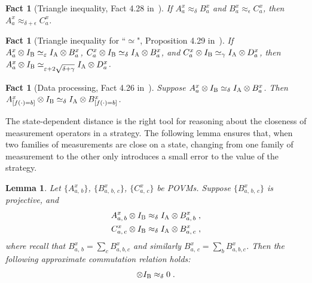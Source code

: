 \documentclass[11pt]{article}
\newtheorem{lemma}[theorem]{Lemma}
\newtheorem{fact}[theorem]{Fact}
\theoremstyle{definition}
\newcommand{\Id}{\ensuremath{I}}
\newcommand{\eps}{\varepsilon}
\newcommand{\labelstyle}[1]{\ensuremath{\textsc{#1}}\xspace}
\newcommand{\alice}{\labelstyle{A}}
\newcommand{\bob}{\labelstyle{B}}
\newcommand{\abc}[1][\delta]{\otimes I_\bob \simeq_{#1} I_\alice \otimes}
\begin{document}
\begin{fact}[Triangle inequality, Fact 4.28 in~\cite{NW19}]
  \label{fact:triangle}
  If $A_a^x \approx_\delta B_a^x$ and $B_a^x \approx_\epsilon C_a^x$, then
  $A_a^x \approx_{\delta + \epsilon} C_a^x$.
\end{fact}

\begin{fact}[Triangle inequality for ``$\simeq$", Proposition 4.29 in~\cite{ML20}]
 \label{fact:triangle-for-simeq}
 If $A_a^x \otimes I_\bob \simeq_\eps I_\alice \otimes B_a^x$,
 $C_a^x \otimes I_\bob \simeq_\delta I_\alice \otimes  B_a^x$,
 and $C_a^x \otimes I_\bob \simeq_\gamma I_\alice \otimes  D_a^x$,
 then $A_a^x \otimes I_\bob \simeq_{\eps + 2\sqrt{\delta + \gamma}} I_\alice \otimes  D_a^x$.
\end{fact}

\begin{fact}[Data processing, Fact 4.26 in~\cite{NW19}]
  \label{fact:data-processing}
  Suppose $A^x_a \abc B^x_a$.
  Then $A^x_{[f(\cdot) = b]} \abc B^x_{[f(\cdot) = b]}$.
\end{fact}


The state-dependent distance is the right tool for reasoning about the closeness
of measurement operators in a strategy.
The following lemma ensures that, when two families of measurements are close on a
state, changing from one family of measurement to the other only introduces
a small error to the value of the strategy.

\begin{lemma}
  \label{lem:commutation-analysis}
  Let $\{A^x_{a,\, b}\}$, $\{B^x_{a,\, b,\, c}\}$, $\{C^x_{a,\, c}\}$ be POVMs.
  Suppose $\{B^x_{a,\, b,\, c}\}$ is projective, and
  \begin{align*}
    A^x_{a,\, b} \otimes \Id_\bob &\approx_\delta \Id_\alice \otimes B^x_{a,\, b}\;,\\
    C^x_{a,\, c} \otimes \Id_\bob &\approx_\delta \Id_\alice \otimes B^x_{a,\, c}\;,
  \end{align*}
	where recall that $B^x_{a,\, b} = \sum_c B^x_{a,b,c}$ and similarly $B^x_{a,\, c}=\sum_b B^x_{a,b,c}$. 
  Then the following approximate commutation relation holds:
  \begin{equation*}
    [A^x_{a,\, b}, C^x_{a,\, c}] \otimes I_\bob \approx_\delta 0\;.
  \end{equation*}
\end{lemma}
\end{document}
